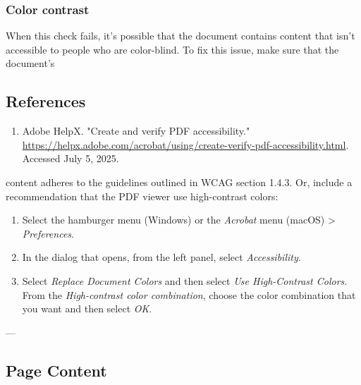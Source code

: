 \subsubsection{Color contrast}
When this check fails, it's possible that the document contains content that isn't accessible to people who are color-blind\cite{AdobeHelpX}.
To fix this issue, make sure that the document's\vfill
\subsection{References}
\begin{enumerate}
    \item Adobe HelpX. "Create and verify PDF accessibility." \url{https://helpx.adobe.com/acrobat/using/create-verify-pdf-accessibility.html}. Accessed July 5, 2025.
\end{enumerate}

content adheres to the guidelines outlined in WCAG section 1.4.3. Or, include a recommendation that the PDF viewer use high-contrast colors:
\begin{enumerate}
    \item Select the hamburger menu (Windows) or the \emph{Acrobat} menu (macOS) > \emph{Preferences}.
    \item In the dialog that opens, from the left panel, select \emph{Accessibility}.
    \item Select \emph{Replace Document Colors} and then select \emph{Use High-Contrast Colors}. From the \emph{High-contrast color combination}, choose the color combination that you want and then select \emph{OK}.
\end{enumerate}

---

\subsection{Page Content}

